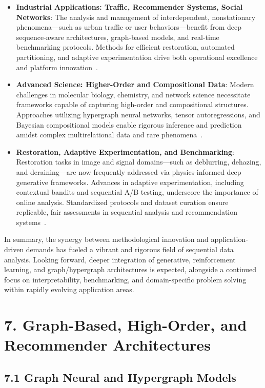 \documentclass[11pt]{article}
\begin{document}
\begin{itemize}
    \item \textbf{Industrial Applications: Traffic, Recommender Systems, Social Networks}: The analysis and management of interdependent, nonstationary phenomena—such as urban traffic or user behaviors—benefit from deep sequence-aware architectures, graph-based models, and real-time benchmarking protocols. Methods for efficient restoration, automated partitioning, and adaptive experimentation drive both operational excellence and platform innovation~\cite{ref2,ref9,ref47,ref58,ref85,ref87}.
    
    \item \textbf{Advanced Science: Higher-Order and Compositional Data}: Modern challenges in molecular biology, chemistry, and network science necessitate frameworks capable of capturing high-order and compositional structures. Approaches utilizing hypergraph neural networks, tensor autoregressions, and Bayesian compositional models enable rigorous inference and prediction amidst complex multirelational data and rare phenomena~\cite{ref58,ref59,ref60,ref61,ref65,ref74}.
    
    \item \textbf{Restoration, Adaptive Experimentation, and Benchmarking}: Restoration tasks in image and signal domains—such as deblurring, dehazing, and deraining—are now frequently addressed via physics-informed deep generative frameworks. Advances in adaptive experimentation, including contextual bandits and sequential A/B testing, underscore the importance of online analysis. Standardized protocols and dataset curation ensure replicable, fair assessments in sequential analysis and recommendation systems~\cite{ref74,ref80,ref81,ref85,ref86,ref87}.
\end{itemize}

\noindent In summary, the synergy between methodological innovation and application-driven demands has fueled a vibrant and rigorous field of sequential data analysis. Looking forward, deeper integration of generative, reinforcement learning, and graph/hypergraph architectures is expected, alongside a continued focus on interpretability, benchmarking, and domain-specific problem solving within rapidly evolving application areas.

\section{7. Graph-Based, High-Order, and Recommender Architectures}

\subsection{7.1 Graph Neural and Hypergraph Models}
\end{document}
